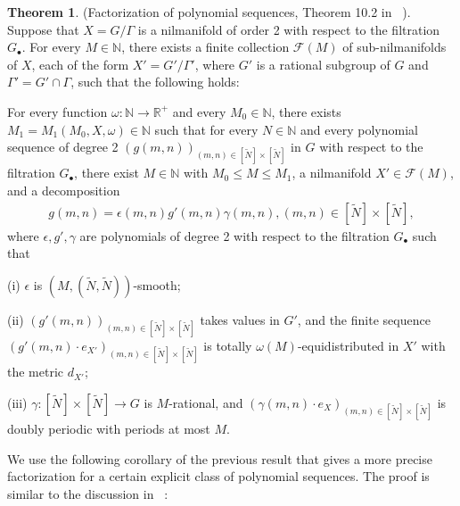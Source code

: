 \documentclass[12pt,amstex]{amsart}
\theoremstyle{definition}
\newtheorem{thm}{Theorem}[section]
\def \e {\epsilon}
\begin{document}
\begin{thm}\label{mFo}(Factorization of polynomial sequences, Theorem 10.2 in ~\cite{GT}). Suppose that $X=G/\Gamma$ is a nilmanifold of order 2 with respect to the filtration $G_{\bullet}$. For every $M\in\mathbb{N}$, there exists a finite collection $\mathcal{F}(M)$ of sub-nilmanifolds of $X$, each of the form $X'=G'/\Gamma'$, where $G'$ is a rational subgroup of
$G$ and $\Gamma'=G'\cap\Gamma$, such that the following holds:

For every function $\omega\colon\mathbb{N}\rightarrow\mathbb{R}^{+}$ and every $M_{0}\in\mathbb{N}$, there exists $M_{1}=M_{1}(M_{0},X,\omega)\in\mathbb{N}$ such that for every $N\in\mathbb{N}$ and every polynomial sequence of degree 2  $(g(m,n))_{(m,n)\in[\tilde{N}]\times[\tilde{N}]}$ in $G$ with respect to the filtration $G_{\bullet}$, there exist $M\in\mathbb{N}$ with $M_{0}\leq M\leq M_{1}$, a nilmanifold $X'\in\mathcal{F}(M)$, and a decomposition
\begin{equation}\nonumber
  \begin{split}
  g(m,n)=\e(m,n)g'(m,n)\gamma(m,n), (m,n)\in[\tilde{N}]\times[\tilde{N}],
  \end{split}
\end{equation}
where $\e,g',\gamma$ are polynomials of degree 2 with respect to the filtration $G_{\bullet}$ such that

(i) $\e$ is $(M,(\tilde{N},\tilde{N}))$-smooth;

(ii) $(g'(m,n))_{(m,n)\in[\tilde{N}]\times[\tilde{N}]}$ takes values in $G'$, and the finite sequence $(g'(m,n)\cdot e_{X'})_{(m,n)\in[\tilde{N}]\times[\tilde{N}]}$ is totally $\omega(M)$-equidistributed in $X'$ with the metric $d_{X'}$;

(iii) $\gamma\colon[\tilde{N}]\times[\tilde{N}]\rightarrow G$ is $M$-rational, and $(\gamma(m,n)\cdot e_{X})_{(m,n)\in[\tilde{N}]\times[\tilde{N}]}$ is doubly periodic with periods at most $M$.
\end{thm}

We use the following corollary of the previous result that gives a more precise
factorization for a certain explicit class of polynomial sequences. The proof is similar to the discussion in ~\cite{FHel}:
\end{document}
